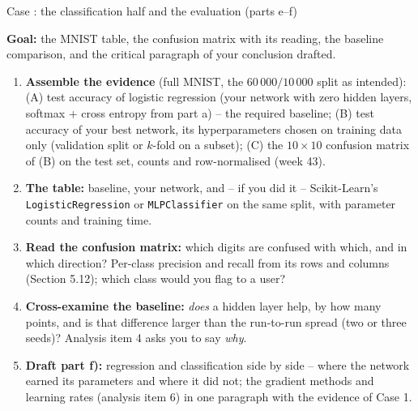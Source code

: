 \documentclass[10pt,aspectratio=169]{beamer}
\newcounter{case}
\newenvironment{case}[1][]{%
  \stepcounter{case}%
  \begin{frame}[fragile,environment=case]{Case \arabic{case}: #1}%
}{\end{frame}}
\begin{document}

\begin{case}[the classification half and the evaluation (parts e--f)]
\footnotesize
\textbf{Goal:} the MNIST table, the confusion matrix with its reading, the
baseline comparison, and the critical paragraph of your conclusion drafted.
\begin{enumerate}
  \item \textbf{Assemble the evidence} (full MNIST, the $60\,000/10\,000$
        split as intended): (A) test accuracy of logistic regression (your
        network with zero hidden layers, softmax + cross entropy from part a)
        -- the required baseline; (B) test accuracy of your best network, its
        hyperparameters chosen on training data only (validation split or
        $k$-fold on a subset); (C) the $10\times10$ confusion matrix of (B)
        on the test set, counts and row-normalised (week 43).
  \item \textbf{The table:} baseline, your network, and -- if you did it --
        Scikit-Learn's \texttt{LogisticRegression} or \texttt{MLPClassifier}
        on the same split, with parameter counts and training time.
  \item \textbf{Read the confusion matrix:} which digits are confused with
        which, and in which direction?  Per-class precision and recall from
        its rows and columns (Section 5.12); which class would you flag to a
        user?
  \item \textbf{Cross-examine the baseline:} \emph{does} a hidden layer
        help, by how many points, and is that difference larger than the
        run-to-run spread (two or three seeds)?  Analysis item 4 asks you to
        say \emph{why}.
  \item \textbf{Draft part f):} regression and classification side by side
        -- where the network earned its parameters and where it did not; the
        gradient methods and learning rates (analysis item 6) in one
        paragraph with the evidence of Case 1.
\end{enumerate}
\end{case}
\end{document}
